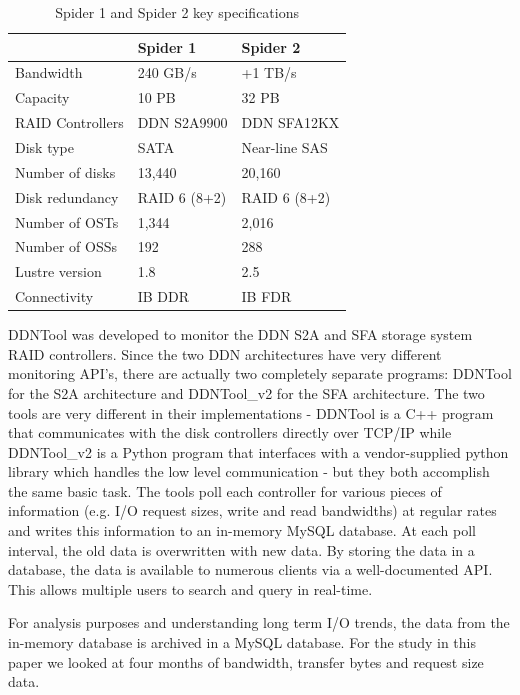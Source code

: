 \begin{table}
\begin{center}
\begin{tabular}{l||l|l}
 & Spider 1 & Spider 2\\
\hline
Bandwidth & 240 GB/s & +1 TB/s \\
Capacity & 10 PB & 32 PB \\
RAID Controllers & DDN S2A9900 & DDN SFA12KX\\
Disk type & SATA & Near-line SAS\\
Number of disks & 13,440 & 20,160\\
Disk redundancy & RAID 6 (8+2) & RAID 6 (8+2)\\
Number of OSTs & 1,344 & 2,016\\
Number of OSSs & 192 & 288\\
Lustre version & 1.8 & 2.5\\
Connectivity & IB DDR & IB FDR\\ 
\end{tabular}
\end{center}
\caption{Spider 1 and Spider 2 key specifications}
\label{table:spider12}
\end{table}


DDNTool \cite{ddntool10:ross} was developed to monitor the DDN S2A and SFA
storage system RAID controllers. Since the two DDN architectures have very
different monitoring API's, there are actually two completely separate
programs:  DDNTool for the S2A architecture and DDNTool\_v2 for the SFA
architecture. The two tools are very different in their implementations -
DDNTool is a C++ program that communicates with the disk controllers directly
over TCP/IP while DDNTool\_v2 is a Python program that interfaces with a
vendor-supplied python library which handles the low level communication - but
they both accomplish the same basic task. The tools poll each controller for
various pieces of information (e.g. I/O request sizes, write and read
bandwidths) at regular rates and writes this information to an in-memory MySQL database.
At each poll interval, the old data is overwritten with new data. By storing the data in
a database, the data is available to numerous clients via a
well-documented API. This allows multiple users to search and query in
real-time. 

For analysis purposes and understanding long term I/O trends, the data from the in-memory database is
archived in a MySQL database. For the study in this paper we looked at four months of bandwidth, transfer bytes and request size data.    

